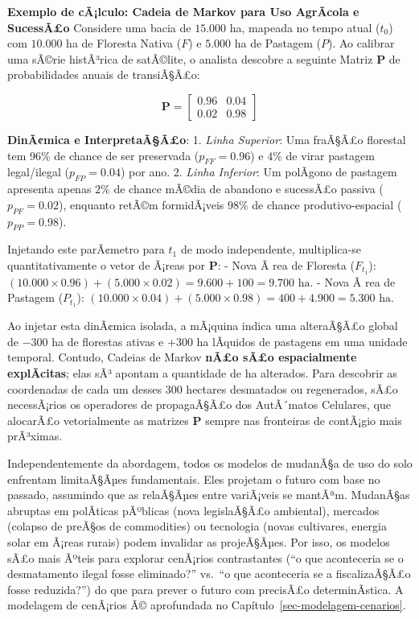 \documentclass[
  portuguese,
  11pt,
  a4paper,
  open=any]{scrbook}
\begin{document}
\textbf{Exemplo de cÃ¡lculo: Cadeia de Markov para Uso AgrÃcola e
SucessÃ£o} Considere uma bacia de \(15.000\) ha, mapeada no tempo atual
(\(t_0\)) com \(10.000\) ha de Floresta Nativa (\(F\)) e \(5.000\) ha de
Pastagem (\(P\)). Ao calibrar uma sÃ©rie histÃ³rica de satÃ©lite, o
analista descobre a seguinte Matriz \(\mathbf{P}\) de probabilidades
anuais de transiÃ§Ã£o:

\[
\mathbf{P} = 
\begin{bmatrix} 
0.96 & 0.04 \\ 
0.02 & 0.98 
\end{bmatrix}
\]

\textbf{DinÃ¢mica e InterpretaÃ§Ã£o}: 1. \emph{Linha Superior}: Uma
fraÃ§Ã£o florestal tem \(96\%\) de chance de ser preservada
(\(p_{FF}=0.96\)) e \(4\%\) de virar pastagem legal/ilegal
(\(p_{FP}=0.04\)) por ano. 2. \emph{Linha Inferior}: Um polÃgono de
pastagem apresenta apenas \(2\%\) de chance mÃ©dia de abandono e
sucessÃ£o passiva (\(p_{PF}=0.02\)), enquanto retÃ©m formidÃ¡veis
\(98\%\) de chance produtivo-espacial (\(p_{PP}=0.98\)).

Injetando este parÃ¢metro para \(t_1\) de modo independente,
multiplica-se quantitativamente o vetor de Ã¡reas por \(\mathbf{P}\): -
Nova Ã rea de Floresta (\(F_{t_1}\)):
\((10.000 \times 0.96) + (5.000 \times 0.02) = 9.600 + 100 = 9.700 \text{ ha}\).
- Nova Ã rea de Pastagem (\(P_{t_1}\)):
\((10.000 \times 0.04) + (5.000 \times 0.98) = 400 + 4.900 = 5.300 \text{ ha}\).

Ao injetar esta dinÃ¢mica isolada, a mÃ¡quina indica uma alteraÃ§Ã£o
global de \(-300\) ha de florestas ativas e \(+300\) ha lÃquidos de
pastagens em uma unidade temporal. Contudo, Cadeias de Markov
\textbf{nÃ£o sÃ£o espacialmente explÃcitas}; elas sÃ³ apontam a
quantidade de ha alterados. Para descobrir as coordenadas de cada um
desses 300 hectares desmatados ou regenerados, sÃ£o necessÃ¡rios os
operadores de propagaÃ§Ã£o dos AutÃ´matos Celulares, que alocarÃ£o
vetorialmente as matrizes \(\mathbf{P}\) sempre nas fronteiras de
contÃ¡gio mais prÃ³ximas.

Independentemente da abordagem, todos os modelos de mudanÃ§a de uso do
solo enfrentam limitaÃ§Ãµes fundamentais. Eles projetam o futuro com
base no passado, assumindo que as relaÃ§Ãµes entre variÃ¡veis se
mantÃªm. MudanÃ§as abruptas em polÃ­ticas pÃºblicas (nova legislaÃ§Ã£o
ambiental), mercados (colapso de preÃ§os de commodities) ou tecnologia
(novas cultivares, energia solar em Ã¡reas rurais) podem invalidar as
projeÃ§Ãµes. Por isso, os modelos sÃ£o mais Ãºteis para explorar
cenÃ¡rios contrastantes (``o que aconteceria se o desmatamento ilegal
fosse eliminado?'' vs.~``o que aconteceria se a fiscalizaÃ§Ã£o fosse
reduzida?'') do que para prever o futuro com precisÃ£o determinÃ­stica. A
modelagem de cenÃ¡rios Ã© aprofundada no
Capítulo~\ref{sec-modelagem-cenarios}.
\end{document}

